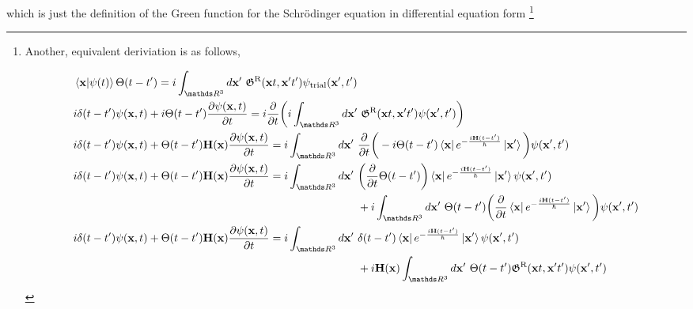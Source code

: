 which is just the definition of the Green function for the Schr\"odinger equation in differential equation form
\iffalse\footnote{Another, equivalent deriviation is as follows,

\begin{equation}
    \begin{split}
        &\bra{{\bf x}} \ket{\psi(t)} \Theta(t-t') = i \int_{\R^3} d{\bf x}' \blanky \mathfrak{G}^{\textnormal{R}}({\bf x}t, {\bf x}'t') \psi_{\textnormal{trial}}({\bf x}', t') \\
        &i \delta(t-t') \psi({\bf x}, t) + i \Theta(t-t') \frac{\partial \psi({\bf x}, t)}{\partial t} = i \frac{\partial}{\partial t} \bigg(i \int_{\R^3} d{\bf x}' \blanky \mathfrak{G}^{\textnormal{R}}({\bf x}t, {\bf x}'t') \psi({\bf x}', t') \bigg) \\
        & i \delta(t-t') \psi({\bf x}, t) + \Theta(t-t') {\bf H}({\bf x}) \frac{\partial \psi({\bf x}, t)}{\partial t} = i \int_{\R^3} d{\bf x}' \blanky \frac{\partial}{\partial t} \bigg( - i \Theta(t-t') \bra{{\bf x}} e^{-\frac{i {\bf H} (t-t')}{\hbar}} \ket{{\bf x}'}\bigg) \psi({\bf x}', t') \\
        &  i \delta(t-t') \psi({\bf x}, t) + \Theta(t-t') {\bf H}({\bf x}) \frac{\partial \psi({\bf x}, t)}{\partial t} = i \int_{\R^3} d{\bf x}' \blanky \bigg(\frac{\partial}{\partial t} \Theta(t-t')\bigg) \bra{{\bf x}} e^{-\frac{i {\bf H} (t-t')}{\hbar}} \ket{{\bf x}'} \psi({\bf x}', t') \\
        & \blanky\blanky\blanky\blanky\blanky\blanky\blanky\blanky\blanky\blanky\blanky\blanky\blanky\blanky\blanky\blanky\blanky\blanky\blanky\blanky\blanky\blanky\blanky\blanky\blanky\blanky\blanky\blanky\blanky\blanky\blanky\blanky \blanky\blanky\blanky\blanky\blanky\blanky\blanky\blanky\blanky\blanky\blanky\blanky\blanky\blanky\blanky\blanky\blanky\blanky\blanky\blanky\blanky\blanky\blanky\blanky\blanky\blanky\blanky\blanky\blanky\blanky\blanky\blanky\blanky\blanky\blanky\blanky\blanky\blanky\blanky\blanky\blanky\blanky\blanky\blanky\blanky + i \int_{\R^3} d{\bf x}' \blanky \Theta(t-t') \bigg(\frac{\partial}{\partial t} \bra{{\bf x}} e^{-\frac{i {\bf H} (t-t')}{\hbar}} \ket{{\bf x}'} \bigg) \psi({\bf x}', t')\\
        &  i \delta(t-t') \psi({\bf x}, t) + \Theta(t-t') {\bf H}({\bf x}) \frac{\partial \psi({\bf x}, t)}{\partial t} = i \int_{\R^3} d{\bf x}' \blanky \delta(t-t') \bra{{\bf x}} e^{-\frac{i {\bf H} (t-t')}{\hbar}} \ket{{\bf x}'} \psi({\bf x}', t') \\
        & \blanky\blanky\blanky\blanky\blanky\blanky\blanky\blanky\blanky\blanky\blanky\blanky\blanky\blanky\blanky\blanky\blanky\blanky\blanky\blanky\blanky\blanky\blanky\blanky\blanky\blanky\blanky\blanky\blanky\blanky\blanky\blanky \blanky\blanky\blanky\blanky\blanky\blanky\blanky\blanky\blanky\blanky\blanky\blanky\blanky\blanky\blanky\blanky\blanky\blanky\blanky\blanky\blanky\blanky\blanky\blanky\blanky\blanky\blanky\blanky\blanky\blanky\blanky\blanky\blanky\blanky\blanky\blanky\blanky\blanky\blanky\blanky\blanky\blanky\blanky\blanky\blanky + i {\bf H}({\bf x}) \int_{\R^3} d{\bf x}' \blanky \Theta(t-t') \mathfrak{G}^{\textnormal{R}}({\bf x}t, {\bf x}'t') \psi({\bf x}', t')\\

\end{split}
\end{equation}}
